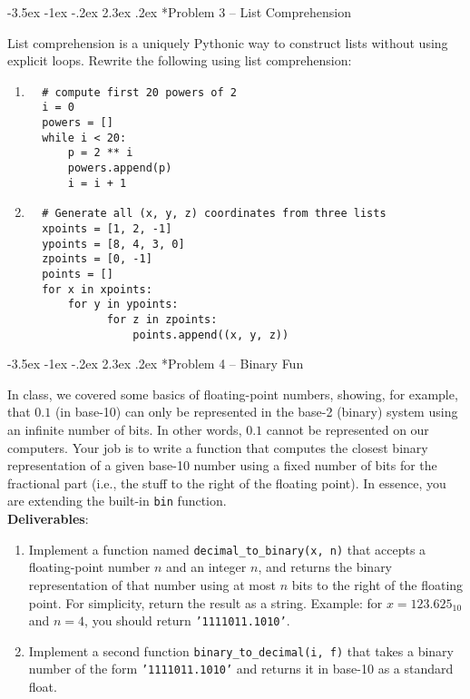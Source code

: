 \documentclass[11pt]{article}
\makeatletter
\renewcommand\section{\@startsection{section}{1}{\z@}%
                                  {-3.5ex \@plus -1ex \@minus -.2ex}%
                                  {2.3ex \@plus.2ex}%
                                  {\normalfont\bfseries}}
\makeatother
\begin{document}
\section*{Problem 3 -- List Comprehension}

List comprehension is a uniquely Pythonic way to construct lists
without using explicit loops.  Rewrite the following using list 
comprehension:

\begin{enumerate}
 \item 
  \begin{lstlisting}
  # compute first 20 powers of 2
  i = 0
  powers = []
  while i < 20:
      p = 2 ** i
      powers.append(p)
      i = i + 1
  \end{lstlisting}
 \item 
  \begin{lstlisting}
  # Generate all (x, y, z) coordinates from three lists
  xpoints = [1, 2, -1]
  ypoints = [8, 4, 3, 0]
  zpoints = [0, -1]
  points = []
  for x in xpoints:
      for y in ypoints:
	        for z in zpoints:
	            points.append((x, y, z))
  \end{lstlisting}
  
\end{enumerate}
  
\section*{Problem 4 -- Binary Fun}

In class, we covered some basics of floating-point numbers, showing,
for example, that $0.1$ (in base-10) can only be represented 
in the base-2 (binary) system using an infinite number of bits.
In other words, $0.1$ cannot be represented on our computers.  Your 
job is to write a function that computes the closest binary
representation of a given base-10 number using a fixed number of 
bits for the fractional part (i.e., the stuff to the right of 
the floating point).  In essence, you are extending 
the built-in {\tt bin} function. \\

{\bf Deliverables}:
\begin{enumerate}
 \item Implement a function named {\tt decimal\_to\_binary(x, n)} 
       that accepts a floating-point number $n$ and an integer 
       $n$, and returns the binary representation of that 
       number using at most $n$ bits to the right of the 
       floating point.  For simplicity, return the 
       result as a string.  Example: for $x = 123.625_{10}$ and $n = 4$, you 
       should return {\tt '1111011.1010'}. 
 \item Implement a second function {\tt binary\_to\_decimal(i, f)} that 
       takes a binary number of the form  {\tt '1111011.1010'} and returns
       it in base-10 as a standard float.  
\end{enumerate}
\end{document}
